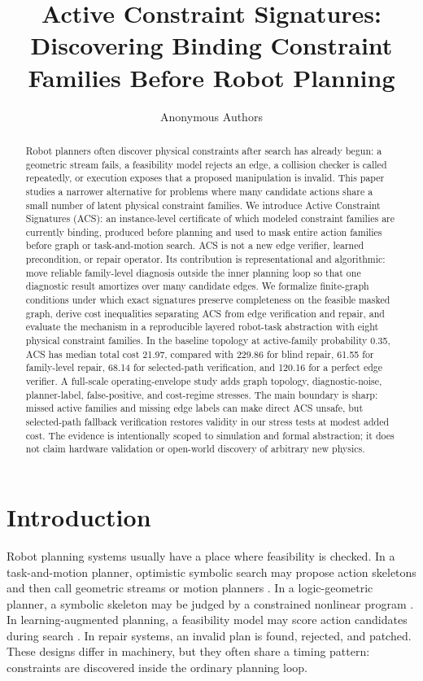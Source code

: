 \documentclass{article}
\title{Active Constraint Signatures: Discovering Binding Constraint Families Before Robot Planning}
\author{Anonymous Authors}
\newcommand{\ACS}{\textsc{ACS}}
\begin{document}
\maketitle

\begin{abstract}
Robot planners often discover physical constraints after search has already begun: a geometric stream fails, a feasibility model rejects an edge, a collision checker is called repeatedly, or execution exposes that a proposed manipulation is invalid. This paper studies a narrower alternative for problems where many candidate actions share a small number of latent physical constraint families. We introduce Active Constraint Signatures (\ACS{}): an instance-level certificate of which modeled constraint families are currently binding, produced before planning and used to mask entire action families before graph or task-and-motion search. \ACS{} is not a new edge verifier, learned precondition, or repair operator. Its contribution is representational and algorithmic: move reliable family-level diagnosis outside the inner planning loop so that one diagnostic result amortizes over many candidate edges. We formalize finite-graph conditions under which exact signatures preserve completeness on the feasible masked graph, derive cost inequalities separating \ACS{} from edge verification and repair, and evaluate the mechanism in a reproducible layered robot-task abstraction with eight physical constraint families. In the baseline topology at active-family probability 0.35, \ACS{} has median total cost 21.97, compared with 229.86 for blind repair, 61.55 for family-level repair, 68.14 for selected-path verification, and 120.16 for a perfect edge verifier. A full-scale operating-envelope study adds graph topology, diagnostic-noise, planner-label, false-positive, and cost-regime stresses. The main boundary is sharp: missed active families and missing edge labels can make direct \ACS{} unsafe, but selected-path fallback verification restores validity in our stress tests at modest added cost. The evidence is intentionally scoped to simulation and formal abstraction; it does not claim hardware validation or open-world discovery of arbitrary new physics.
\end{abstract}

\section{Introduction}

Robot planning systems usually have a place where feasibility is checked. In a task-and-motion planner, optimistic symbolic search may propose action skeletons and then call geometric streams or motion planners \citep{garrett2020pddlstream,vu2024coast}. In a logic-geometric planner, a symbolic skeleton may be judged by a constrained nonlinear program \citep{toussaint2015logic,ly2024rlgp}. In learning-augmented planning, a feasibility model may score action candidates during search \citep{xu2022accelerating,aitbouhsain2023simultaneous}. In repair systems, an invalid plan is found, rejected, and patched. These designs differ in machinery, but they often share a timing pattern: constraints are discovered inside the ordinary planning loop.
\end{document}
